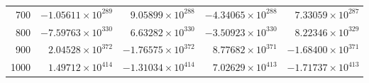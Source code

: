 \documentclass[12pt]{amsart}
\numberwithin{equation}{section}
\theoremstyle{boldremark}
\begin{document}
\begin{table}[h!]
{\begin{tabular}{rrrrr}
700  & $-1.05611\times 10^{289}$ & $9.05899\times 10^{288}$ & $-4.34065\times 10^{288}$ & $7.33059\times 10^{287}$ \\
800  & $-7.59763\times 10^{330}$ & $6.63282\times 10^{330}$ & $-3.50923\times 10^{330}$ & $8.22346\times 10^{329}$ \\
900  & $2.04528\times 10^{372}$ & $-1.76575\times 10^{372}$ & $8.77682\times 10^{371}$ & $-1.68400\times 10^{371}$ \\
1000 & $1.49712\times 10^{414}$ & $-1.31034\times 10^{414}$ & $7.02629\times 10^{413}$ & $-1.71737\times 10^{413}$ \\
\hline
\end{tabular}}
\end{table}

\newpage

\begingroup
\setlength{\textfloatsep}{7pt}
\setlength{\floatsep}{7pt}
\setlength{\intextsep}{7pt}
\setlength{\abovecaptionskip}{4pt}
\setlength{\belowcaptionskip}{4pt}
\renewcommand{\arraystretch}{1.15}
\end{document}

